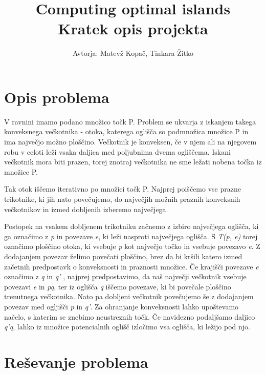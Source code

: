 \documentclass[a4, 12pt]{article}
\begin{document}
\title{ Computing optimal islands  \\
  \large Kratek opis projekta}

\author{Avtorja: Matevž Kopač, Tinkara Žitko}

\maketitle

\section{Opis problema}
V ravnini imamo podano množico točk P. Problem se ukvarja z iskanjem takega konveksnega večkotnika - otoka, katerega oglišča so podmnožica množice P in ima največjo možno ploščino. Večkotnik je konveksen, če v njem ali na njegovem robu v celoti leži vsaka daljica med poljubnima dvema ogliščema. Iskani večkotnik mora biti prazen, torej znotraj večkotnika ne sme ležati nobena točka iz množice P. 

Tak otok iščemo iterativno po množici točk P. Najprej poiščemo vse prazne trikotnike, ki jih nato povečujemo, do največjih možnih praznih konveksnih večkotnikov in izmed dobljenih izberemo največjega.

Postopek na vsakem dobljenem trikotniku začnemo z izbiro največjega oglišča, ki ga označimo z \emph{p}  in povezave \emph{e}, ki leži nasproti največjega oglišča. S \emph{T(p, e)} torej označimo ploščino otoka, ki vsebuje \emph{p} kot največjo točko in vsebuje povezavo \emph{e}. Z dodajanjem povezav želimo povečati ploščino, brez da bi kršili katero izmed začetnih predpostavk o konveksnosti in praznosti množice. Če krajišči povezave \emph{e} označimo z \emph{q} in \emph{q'} , najprej predpostavimo, da naš največji večkotnik vsebuje povezavi \emph{e} in \emph{pq}, ter iz oglišča \emph{q} iščemo povezave, ki bi povečale ploščino trenutnega večkotnika. Nato pa dobljeni večkotnik povečujemo še z dodajanjem povezav med ogljišči \emph{p} in \emph{q'}. 
Za ohranjanje konveksnosti lahko upoštevamo načelo, s katerim se znebimo neustreznih točk. Če navidezno podaljšamo daljico \emph{q'q}, lahko iz množice potencialnih oglišč izločimo vsa oglišča, ki ležijo pod njo.

\section{Reševanje problema}
\end{document}
